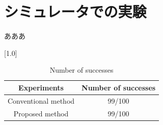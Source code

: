 \documentclass{jarticle}
\begin{document}
\newpage

\section{シミュレータでの実験}
あああ\\

\begin{table}[h!]
  \centering
  \caption{Number of successes} \vspace*{2mm}
    \scalebox{1.0}[1.0] {
    \begin{tabular}{|c|c|}
      \hline\hline
      Experiments & Number of successes \\
      \hline\hline
      Conventional method & 99/100 \\
      Proposed method & 99/100\\
      \hline 
    \end{tabular} }
\end {table}
\end{document}
